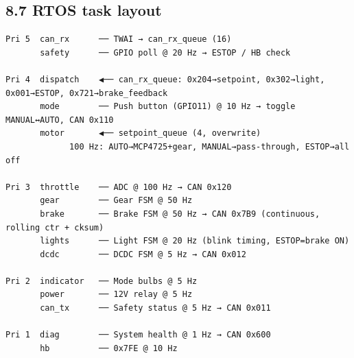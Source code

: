 \documentclass[12pt,a4paper,oneside]{report}
\begin{document}
\subsection{8.7 RTOS task layout}\label{rtos-task-layout-1}

\begin{verbatim}
Pri 5  can_rx      ── TWAI → can_rx_queue (16)
       safety      ── GPIO poll @ 20 Hz → ESTOP / HB check

Pri 4  dispatch    ◀── can_rx_queue: 0x204→setpoint, 0x302→light, 0x001→ESTOP, 0x721→brake_feedback
       mode        ── Push button (GPIO11) @ 10 Hz → toggle MANUAL↔AUTO, CAN 0x110
       motor       ◀── setpoint_queue (4, overwrite)
             100 Hz: AUTO→MCP4725+gear, MANUAL→pass-through, ESTOP→all off

Pri 3  throttle    ── ADC @ 100 Hz → CAN 0x120
       gear        ── Gear FSM @ 50 Hz
       brake       ── Brake FSM @ 50 Hz → CAN 0x7B9 (continuous, rolling ctr + cksum)
       lights      ── Light FSM @ 20 Hz (blink timing, ESTOP=brake ON)
       dcdc        ── DCDC FSM @ 5 Hz → CAN 0x012

Pri 2  indicator   ── Mode bulbs @ 5 Hz
       power       ── 12V relay @ 5 Hz
       can_tx      ── Safety status @ 5 Hz → CAN 0x011

Pri 1  diag        ── System health @ 1 Hz → CAN 0x600
       hb          ── 0x7FE @ 10 Hz
\end{verbatim}
\end{document}

